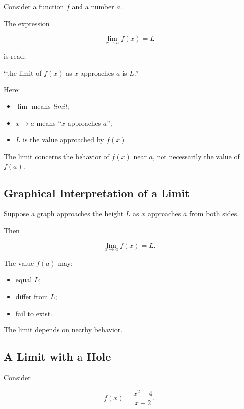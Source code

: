 Consider a function \(f\) and a number \(a\).

The expression

\[ \lim_{x\to a}f(x)=L \]

is read:

``the limit of \(f(x)\) as \(x\) approaches \(a\) is \(L\).''

Here:

\begin{itemize}
    \item \(\lim\) means \emph{limit};
    \item \(x\to a\) means ``\(x\) approaches \(a\)'';
    \item \(L\) is the value approached by \(f(x)\).
\end{itemize}

The limit concerns the behavior of \(f(x)\) near \(a\), not necessarily the
value of \(f(a)\).

\subsection{Graphical Interpretation of a Limit}
\label{subsec:graphical-limit}

Suppose a graph approaches the height \(L\) as \(x\) approaches \(a\) from
both sides.

Then

\[ \lim_{x\to a}f(x)=L. \]

The value \(f(a)\) may:

\begin{itemize}
    \item equal \(L\);
    \item differ from \(L\);
    \item fail to exist.
\end{itemize}

The limit depends on nearby behavior.

\subsection{A Limit with a Hole}
\label{subsec:limit-hole}

Consider

\[ f(x)=\frac{x^2-4}{x-2}. \]

